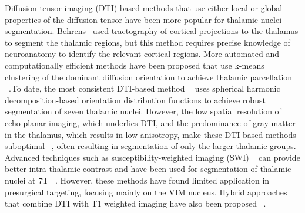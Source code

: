 Diffusion tensor imaging (DTI) based methods that use either local or global properties of the diffusion tensor have been more popular for thalamic nuclei segmentation. Behrens\unskip~\cite{1643371:26789967} used tractography of cortical projections to the thalamus to segment the thalamic regions, but this method requires precise knowledge of neuroanatomy to identify the relevant cortical regions. More automated and computationally efficient methods have been proposed that use k-means clustering of the dominant diffusion orientation to achieve thalamic parcellation \unskip~\cite{1643371:26789911,1643371:26789930,1643371:26789941}.\ensuremath{^{}}To date, the most consistent DTI-based method \unskip~\cite{1643371:26789918}\ensuremath{^{}} uses spherical harmonic decomposition-based orientation distribution functions to achieve robust segmentation of seven thalamic nuclei. However, the low spatial resolution of echo-planar imaging, which underlies DTI, and the predominance of gray matter in the thalamus, which results in low anisotropy, make these DTI-based methods suboptimal \unskip~\cite{1643371:26789960}, often resulting in segmentation of only the larger thalamic groups. Advanced techniques such as susceptibility-weighted imaging (SWI) \unskip~\cite{1643371:26789920} can provide better intra-thalamic contrast and have been used for segmentation of thalamic nuclei at 7T \unskip~\cite{1643371:26789968,1643371:26789923}. However, these methods have found limited application in presurgical targeting, focusing mainly on the VIM nucleus. Hybrid approaches that combine DTI with T1 weighted imaging have also been proposed \unskip~\cite{1643371:26789958,1643371:26789948}.

